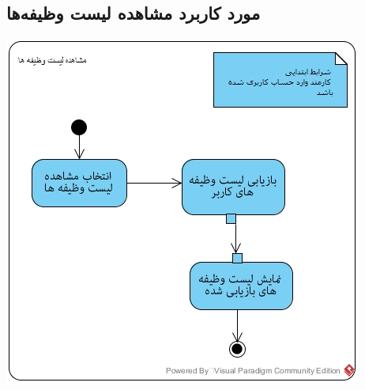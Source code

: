 \newpage
\vspace{2cm}
\subsection*{مورد کاربرد مشاهده لیست وظیفه‌ها}
\vspace{2cm}
\begin{center}
\includegraphics[width=\textwidth]{ActivityDiagrams/29.jpg}
\end{center}

\newpage
\vspace{2cm}
